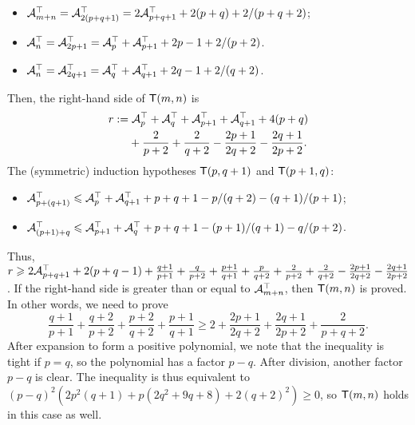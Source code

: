 \begin{enumerate}
\begin{itemize}
      \item \(\mathcal{A}_{m+n}^{\top} = \mathcal{A}_{2(p+q+1)}^{\top} =
        2\mathcal{A}_{p+q+1}^{\top} + 2(p+q) + 2/(p+q+2)\);

      \item \(\mathcal{A}_{n}^{\top} = \mathcal{A}_{2p+1}^{\top} =
        \mathcal{A}_{p}^{\top} + \mathcal{A}_{p+1}^{\top} + 2p - 1 + 2/(p+2)\).

      \item \(\mathcal{A}_{n}^{\top} = \mathcal{A}_{2q+1}^{\top} =
        \mathcal{A}_{q}^{\top} + \mathcal{A}_{q+1}^{\top} + 2q - 1 + 2/(q+2)\).

    \end{itemize}
    Then, the right-hand side of \(\textsf{T}({m,n})\) is
    \begin{align*}
      r &:= \mathcal{A}_{p}^{\top} + \mathcal{A}_{q}^{\top} + \mathcal{A}_{p+1}^{\top}
      + \mathcal{A}_{q+1}^{\top} + 4(p+q)\\
        &\phantom{:=} \; + \frac{2}{p+2} + \frac{2}{q+2}
      - \frac{2p+1}{2q+2} - \frac{2q+1}{2p+2}.
    \end{align*}
    The (symmetric) induction hypotheses \(\textsf{T}({p,q+1})\) and
    \(\textsf{T}({p+1,q})\):
    \begin{itemize}

      \item \(\mathcal{A}_{p+(q+1)}^{\top} \leqslant \mathcal{A}_{p}^{\top} +
        \mathcal{A}_{q+1}^{\top} + p + q + 1 - p/(q+2) - (q+1)/(p+1)\);

      \item \(\mathcal{A}_{(p+1)+q}^{\top} \leqslant \mathcal{A}_{p+1}^{\top} +
        \mathcal{A}_{q}^{\top} + p + q + 1 - (p+1)/(q+1) -
        q/(p+2)\).

    \end{itemize}
    Thus, \(r \geqslant 2\mathcal{A}_{p+q+1}^{\top} + 2(p+q-1) +
    \tfrac{q+1}{p+1} + \tfrac{q}{p+2} + \tfrac{p+1}{q+1} +
    \tfrac{p}{q+2} + \tfrac{2}{p+2} + \tfrac{2}{q+2} -
    \tfrac{2p+1}{2q+2} - \tfrac{2q+1}{2p+2}\). If the right-hand
    side is greater than or equal to \(\mathcal{A}_{m+n}^{\top}\), then
    \(\textsf{T}({m,n})\) is proved. In other words, we need to prove
    \begin{equation*}
      \frac{q+1}{p+1} + \frac{q+2}{p+2} + \frac{p+2}{q+2} +
      \frac{p+1}{q+1} \geqslant 2 + \frac{2p+1}{2q+2} +        
      \frac{2q+1}{2p+2} + \frac{2}{p+q+2}.
    \end{equation*}
    After expansion to form a positive polynomial, we note that the
    inequality is tight if \(p=q\), so the polynomial has a factor
    \(p-q\). After division, another factor \(p-q\) is clear. The
    inequality is thus equivalent to \((p-q)^2(2p^2(q+1) + p(2q^2 + 9q
    + 8) + 2(q+2)^2) \geqslant 0\), so \(\textsf{T}({m,n})\) holds in this
    case as well.

\end{enumerate}
